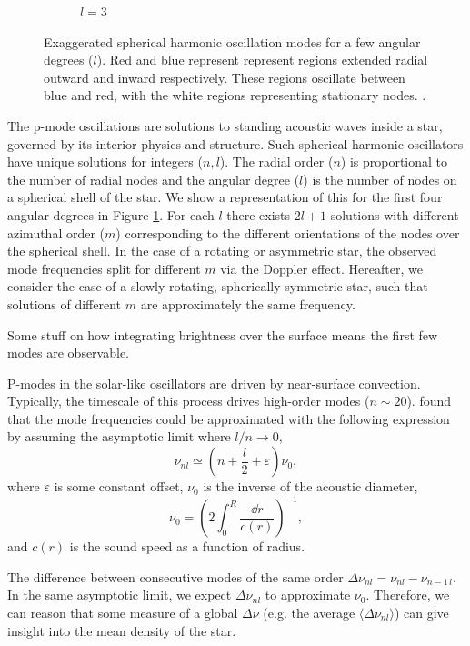 \begin{figure}[tb]
\begin{subfigure}[b]{0.25\linewidth}
        \caption*{$l=3$}
    \end{subfigure}%
    \caption{Exaggerated spherical harmonic oscillation modes for a few angular degrees ($l$). Red and blue represent represent regions extended radial outward and inward respectively. These regions oscillate between blue and red, with the white regions representing stationary nodes. .}
    \label{fig:spherical-harmonics}
\end{figure}

The p-mode oscillations are solutions to standing acoustic waves inside a star, governed by its interior physics and structure. Such spherical harmonic oscillators have unique solutions for integers (\(n, l\)). The radial order (\(n\)) is proportional to the number of radial nodes and the angular degree (\(l\)) is the number of nodes on a spherical shell of the star. We show a representation of this for the first four angular degrees in Figure \ref{fig:spherical-harmonics}. For each \(l\) there exists \(2l+1\) solutions with different azimuthal order (\(m\)) corresponding to the different orientations of the nodes over the spherical shell. In the case of a rotating or asymmetric star, the observed mode frequencies split for different \(m\) via the Doppler effect. Hereafter, we consider the case of a slowly rotating, spherically symmetric star, such that solutions of different \(m\) are approximately the same frequency.

Some stuff on how integrating brightness over the surface means the first few modes are observable.

P-modes in the solar-like oscillators are driven by near-surface convection. Typically, the timescale of this process drives high-order modes (\(n \sim 20\)). \citet{Tassoul1980} found that the mode frequencies could be approximated with the following expression by assuming the asymptotic limit where \(l/n \rightarrow 0\),
%
\begin{equation}
    \nu_{nl} \simeq \left(n + \frac{l}{2} + \varepsilon\right) \nu_0,
\end{equation}
%
where \(\varepsilon\) is some constant offset, \(\nu_0\) is the inverse of the acoustic diameter,
%
\begin{equation}
    \nu_0 = \left(2 \int_{0}^{R} \frac{\dd r}{c(r)}\right)^{-1},
\end{equation}
%
and \(c(r)\) is the sound speed as a function of radius.

The difference between consecutive modes of the same order \(\Delta\nu_{nl} = \nu_{nl} - \nu_{n-1\,l}\). In the same asymptotic limit, we expect \(\Delta\nu_{nl}\) to approximate \(\nu_0\). Therefore, we can reason that some measure of a global \(\Delta\nu\) (e.g. the average \(\langle\Delta\nu_{nl}\rangle\)) can give insight into the mean density of the star.

